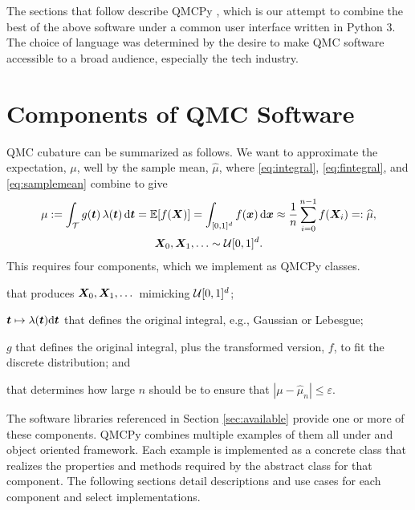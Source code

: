 \documentclass[graybox,footinfo]{svmult}
\newcommand{\QMCPYabs}[1]{\ensuremath{{\left \lvert #1 \right \rvert}}}
\newcommand{\hmu}{\widehat{\mu}}
\newcommand{\cube}{[0,1]^d}
\begin{document}
The sections that follow describe QMCPy \cite{QMCPy2020a}, which is our attempt to combine the best of the above software under a common user interface written in Python 3.  The choice of language was determined by the desire to make QMC software accessible to a broad audience, especially the tech industry.

\section{Components of QMC Software}
QMC cubature can be summarized as follows.  We want to approximate the expectation, $\mu$, well by the sample mean, $\hmu$, where \eqref{eq:integral}, \eqref{eq:fintegral}, and \eqref{eq:samplemean} combine to give
\begin{multline} \label{eq:cubSummary}
	\mu : = \int_\calT g(\bst) \, \lambda(\bst) \, \D \bst  = \bbE[f(\bsX)] = \int_{\cube} f(\bsx) \, \D \bsx \approx \frac 1n \sum_{i=0}^{n-1} f(\bsX_i) =: \hmu, \\
	 \bsX_0, \bsX_1, \ldots \sim \calU\cube.
\end{multline}
This requires four components, which we implement as QMCPy classes.

\begin{description}[format=\textup,format=\textbf]
	
	\item[Discrete Distribution] that produces ${\boldsymbol{X}}_0, {\boldsymbol{X}}_1, \dots$ mimicking ${\mathcal{U}}[0,1]^d$;
	
	\item[True Measure] ${\boldsymbol{t}} \mapsto \lambda ({\boldsymbol{t}}) \mathrm{d} {\boldsymbol{t}}$ that defines the original integral, e.g., Gaussian or Lebesgue;
	
	\item[Integrand] $g$ that  defines the original integral, plus the transformed version, $f$, to fit the discrete distribution; and
	
	\item[Stopping Criterion] that determines how large $n$ should be to ensure that $\QMCPYabs{\mu - \hmu_n} \le \varepsilon$.
\end{description}

The software libraries referenced in Section \ref{sec:available} provide one or more of these components. QMCPy combines multiple examples of them all under and object oriented framework. Each example is implemented as a concrete class that realizes the properties and methods required by the abstract class for that component. The following sections detail descriptions and use cases for each component and select implementations. 
\end{document}
